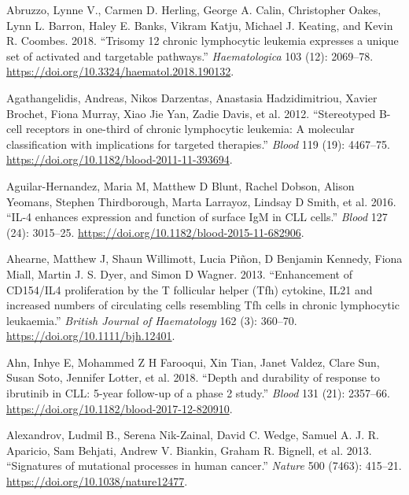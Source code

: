 \documentclass[11pt, a4paper, twosided]{book}
\newenvironment{CSLReferences}%
  {}%
  {\par}
\begin{document}
\hypertarget{refs}{}
\begin{CSLReferences}{1}{0}
\leavevmode{}%
Abruzzo, Lynne V., Carmen D. Herling, George A. Calin, Christopher Oakes, Lynn L. Barron, Haley E. Banks, Vikram Katju, Michael J. Keating, and Kevin R. Coombes. 2018. {``{Trisomy 12 chronic lymphocytic leukemia expresses a unique set of activated and targetable pathways}.''} \emph{Haematologica} 103 (12): 2069--78. \url{https://doi.org/10.3324/haematol.2018.190132}.

\leavevmode{}%
Agathangelidis, Andreas, Nikos Darzentas, Anastasia Hadzidimitriou, Xavier Brochet, Fiona Murray, Xiao Jie Yan, Zadie Davis, et al. 2012. {``{Stereotyped B-cell receptors in one-third of chronic lymphocytic leukemia: A molecular classification with implications for targeted therapies}.''} \emph{Blood} 119 (19): 4467--75. \url{https://doi.org/10.1182/blood-2011-11-393694}.

\leavevmode{}%
Aguilar-Hernandez, Maria M, Matthew D Blunt, Rachel Dobson, Alison Yeomans, Stephen Thirdborough, Marta Larrayoz, Lindsay D Smith, et al. 2016. {``{IL-4 enhances expression and function of surface IgM in CLL cells}.''} \emph{Blood} 127 (24): 3015--25. \url{https://doi.org/10.1182/blood-2015-11-682906}.

\leavevmode{}%
Ahearne, Matthew J, Shaun Willimott, Lucia Piñon, D Benjamin Kennedy, Fiona Miall, Martin J. S. Dyer, and Simon D Wagner. 2013. {``{Enhancement of CD154/IL4 proliferation by the T follicular helper (Tfh) cytokine, IL21 and increased numbers of circulating cells resembling Tfh cells in chronic lymphocytic leukaemia}.''} \emph{British Journal of Haematology} 162 (3): 360--70. \url{https://doi.org/10.1111/bjh.12401}.

\leavevmode{}%
Ahn, Inhye E, Mohammed Z H Farooqui, Xin Tian, Janet Valdez, Clare Sun, Susan Soto, Jennifer Lotter, et al. 2018. {``{Depth and durability of response to ibrutinib in CLL: 5-year follow-up of a phase 2 study.}''} \emph{Blood} 131 (21): 2357--66. \url{https://doi.org/10.1182/blood-2017-12-820910}.

\leavevmode{}%
Alexandrov, Ludmil B., Serena Nik-Zainal, David C. Wedge, Samuel A. J. R. Aparicio, Sam Behjati, Andrew V. Biankin, Graham R. Bignell, et al. 2013. {``{Signatures of mutational processes in human cancer}.''} \emph{Nature} 500 (7463): 415--21. \url{https://doi.org/10.1038/nature12477}.


\end{CSLReferences}
\end{document}
